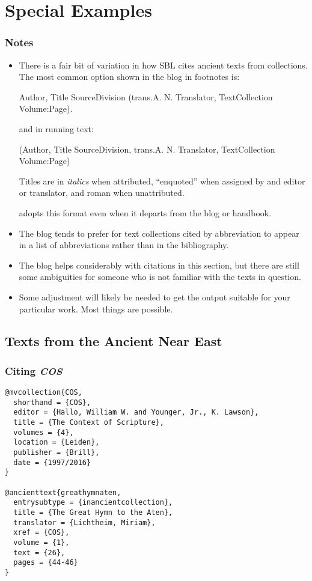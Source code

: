 \documentclass[a4paper]{article}
\begin{document}
\section{Special Examples}

\subsubsection{Notes}

\begin{itemize}
  \item There is a fair bit of variation in how SBL cites ancient texts from
    collections. The most common option shown in the blog in footnotes is:

    Author, Title SourceDivision (trans.\@ A. N. Translator,
    TextCollection Volume:Page).

    and in running text:

    (Author, Title SourceDivision, trans.\@ A. N. Translator,
    TextCollection Volume:Page)

    Titles are in \emph{italics} when attributed, “enquoted” when assigned by
    and editor or translator, and roman when unattributed.

     adopts this format even when it departs from the blog
    or handbook.
  \item The blog tends to prefer for text collections cited by abbreviation to
    appear in a list of abbreviations rather than in the bibliography.
  \item The blog helps considerably with citations in this section, but there
    are still some ambiguities for someone who is not familiar with the texts
    in question.
  \item Some adjustment will likely be needed to get the output suitable for
    your particular work. Most things are possible.
\end{itemize}

\subsection{Texts from the Ancient Near East}

\subsubsection{Citing \emph{COS}}

\begin{verbatim}
@mvcollection{COS,
  shorthand = {COS},
  editor = {Hallo, William W. and Younger, Jr., K. Lawson},
  title = {The Context of Scripture},
  volumes = {4},
  location = {Leiden},
  publisher = {Brill},
  date = {1997/2016}
}

@ancienttext{greathymnaten,
  entrysubtype = {inancientcollection},
  title = {The Great Hymn to the Aten},
  translator = {Lichtheim, Miriam},
  xref = {COS},
  volume = {1},
  text = {26},
  pages = {44-46}
}
\end{verbatim}
\end{document}
